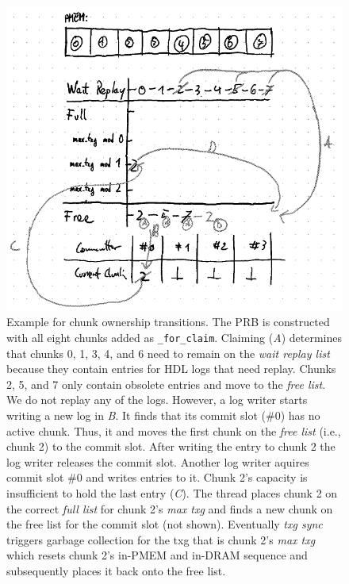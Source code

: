 \documentclass[12pt,a4paper,twoside]{book}
\begin{document}
\begin{figure}[H]
    \centering
    \includegraphics{fig/prb_chunk_ownership_cycle__example}
    \caption{
        Example for chunk ownership transitions.
        The PRB is constructed with all eight chunks added as \lstinline{_for_claim}.
        Claiming (\textit{A}) determines that chunks 0, 1, 3, 4, and 6 need to remain on the \textit{wait replay list} because they contain entries for HDL logs that need replay.
        Chunks 2, 5, and 7 only contain obsolete entries and move to the \textit{free list}.
        We do not replay any of the logs.
        However, a log writer starts writing a new log in \textit{B}.
        It finds that its commit slot (\#0) has no active chunk.
        Thus, it and moves the first chunk on the \textit{free list} (i.e., chunk 2) to the commit slot.
        After writing the entry to chunk 2 the log writer releases the commit slot.
        Another log writer aquires commit slot \#0 and writes entries to it.
        Chunk 2's capacity is insufficient to hold the last entry (\textit{C}).
        The thread places chunk 2 on the correct \textit{full list} for chunk 2's \textit{max txg} and finds a new chunk on the free list for the commit slot (not shown).
        Eventually \textit{txg sync} triggers garbage collection for the txg that is chunk 2's \textit{max txg} which resets chunk 2's in-PMEM and in-DRAM sequence and subsequently places it back onto the free list.
    }
    \label{fig:prb_chunk_ownership_cycle__example}
\end{figure}
\end{document}
